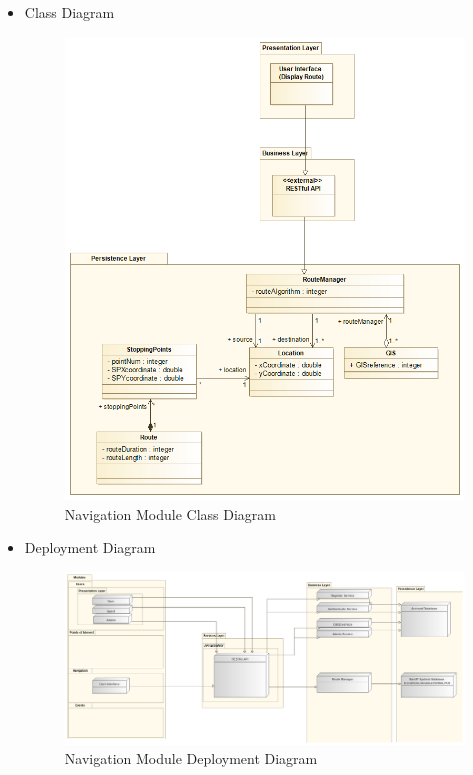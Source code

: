 \documentclass{article}
\begin{document}
			\begin{itemize}
 				\item Class Diagram
 				\begin{center}
 					\begin{figure}[!h]
 						\includegraphics[scale=0.275]{navigationCD.png}
 						\caption{Navigation Module Class Diagram}
 					\end{figure}
 				\end{center}
 				\pagebreak
			
			\item Deployment Diagram
			\begin{center}
				\begin{figure}[!h]
					\includegraphics[angle=90, scale=0.35]{navigationDeploymentDiagram.png}
					\caption{Navigation Module Deployment Diagram}
				\end{figure}
			\end{center}
			\pagebreak
			

\end{itemize}
\end{document}
